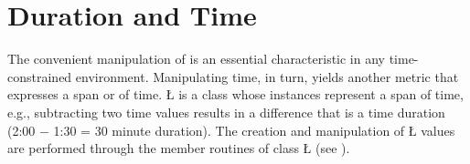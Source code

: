 \documentclass[openright,twoside]{report}
\begin{document}
\section{Duration and Time}
\label{s:DurationTime}

The convenient manipulation of  is an essential characteristic in any time-constrained environment.
Manipulating time, in turn, yields another metric that expresses a span or  of time.
\LGinlinetrue\LGbegin\lgrinde\L{}\endlgrinde\LGend{} is a class whose instances represent a span of time, e.g., subtracting two time values results in a difference that is a time duration (2:00 $-$ 1:30 = 30 minute duration).
The creation and manipulation of \LGinlinetrue\LGbegin\lgrinde\L{}\endlgrinde\LGend{} values are performed through the member routines of class \LGinlinetrue\LGbegin\lgrinde\L{}\endlgrinde\LGend{} (see ).
\end{document}
